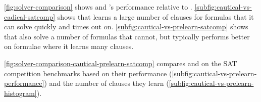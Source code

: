 \autoref{fig:solver-comparison} shows \tool and \cadical's performance relative
to \cadical.
\autoref{subfig:cautical-vs-cadical-satcomp} shows that \tool learns a large
number of \pr clauses for formulas that it can solve quickly and \cadical times
out on. \autoref{subfig:cautical-vs-prelearn-satcomp} shows that \prelearn also
solve a number of formulas that \tool cannot, but \tool typically performs
better on formulae where it learns many \pr clauses.

\autoref{fig:solver-comparison-cautical-prelearn-satcomp} compares \tool and \prelearn on the SAT
competition benchmarks based on their performance (\autoref{subfig:cautical-vs-prelearn-performance}) 
and the number of \pr clauses they learn (\autoref{subfig:cautical-vs-prelearn-histogram}).











